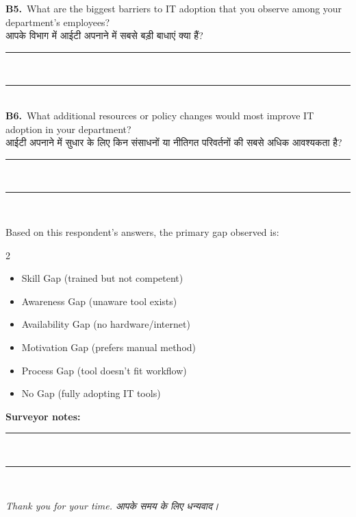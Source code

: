 \documentclass[11pt,a4paper]{article}
\newcommand{\hindi}[1]{{\hindifont #1}}
\newcommand{\q}[2]{%
  \vspace{4pt}
  \noindent\textbf{#1.}~#2\\[2pt]
}
\newcommand{\ans}{%
  \noindent\rule{\textwidth}{0.3pt}\\[3pt]
}
\newcommand{\choices}[1]{%
  \begin{itemize}[label=$\square$, leftmargin=1.4em, itemsep=1pt, topsep=2pt]
    #1
  \end{itemize}
}
\begin{document}
\begin{tcolorbox}
\q{B5}{What are the biggest barriers to IT adoption that you observe among your department's employees?\\
\hindi{आपके विभाग में आईटी अपनाने में सबसे बड़ी बाधाएं क्या हैं?}}
\ans\ans

\q{B6}{What additional resources or policy changes would most improve IT adoption in your department?\\
\hindi{आईटी अपनाने में सुधार के लिए किन संसाधनों या नीतिगत परिवर्तनों की सबसे अधिक आवश्यकता है?}}
\ans\ans

\end{tcolorbox}

\vspace{0.4cm}

\begin{tcolorbox}[colback=white,colframe=govgold,arc=2mm,boxrule=0.6pt,
  title={\textbf{Surveyor's Gap Classification (Fill after interview -- not shown to respondent)}},fonttitle=\small\bfseries]
\small
Based on this respondent's answers, the primary gap observed is:
\begin{multicols}{2}
\choices{
  \item Skill Gap (trained but not competent)
  \item Awareness Gap (unaware tool exists)
  \item Availability Gap (no hardware/internet)
  \item Motivation Gap (prefers manual method)
  \item Process Gap (tool doesn't fit workflow)
  \item No Gap (fully adopting IT tools)
}
\end{multicols}
\noindent\textbf{Surveyor notes:}\\
\ans\ans
\end{tcolorbox}

\vspace{0.2cm}
\begin{center}
\small\textit{Thank you for your time. \hindi{आपके समय के लिए धन्यवाद।}}
\end{center}
\end{document}
